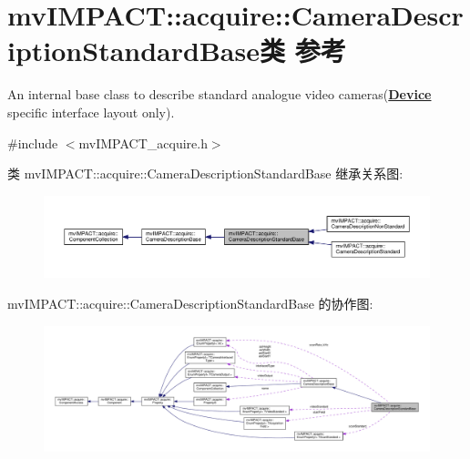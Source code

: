 \hypertarget{classmv_i_m_p_a_c_t_1_1acquire_1_1_camera_description_standard_base}{\section{mv\+I\+M\+P\+A\+C\+T\+:\+:acquire\+:\+:Camera\+Description\+Standard\+Base类 参考}
\label{classmv_i_m_p_a_c_t_1_1acquire_1_1_camera_description_standard_base}
}


An internal base class to describe standard analogue video cameras({\bfseries \hyperlink{classmv_i_m_p_a_c_t_1_1acquire_1_1_device}{Device}} specific interface layout only).  




{\ttfamily \#include $<$mv\+I\+M\+P\+A\+C\+T\+\_\+acquire.\+h$>$}



类 mv\+I\+M\+P\+A\+C\+T\+:\+:acquire\+:\+:Camera\+Description\+Standard\+Base 继承关系图\+:
\nopagebreak
\begin{figure}[H]
\begin{center}
\leavevmode
\includegraphics[width=350pt]{classmv_i_m_p_a_c_t_1_1acquire_1_1_camera_description_standard_base__inherit__graph}
\end{center}
\end{figure}


mv\+I\+M\+P\+A\+C\+T\+:\+:acquire\+:\+:Camera\+Description\+Standard\+Base 的协作图\+:
\nopagebreak
\begin{figure}[H]
\begin{center}
\leavevmode
\includegraphics[width=350pt]{classmv_i_m_p_a_c_t_1_1acquire_1_1_camera_description_standard_base__coll__graph}
\end{center}
\end{figure}
